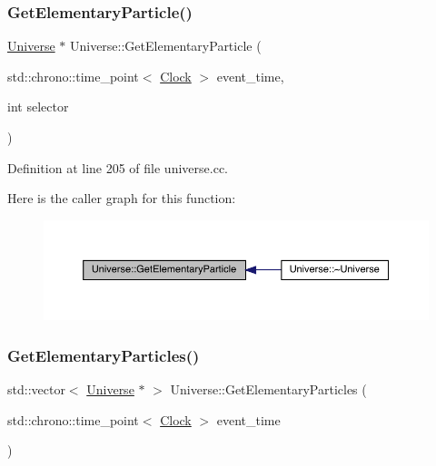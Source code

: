 \subsubsection{\texorpdfstring{Get\+Elementary\+Particle()}{GetElementaryParticle()}}
{\footnotesize\ttfamily \hyperlink{class_universe}{Universe} $\ast$ Universe\+::\+Get\+Elementary\+Particle (\begin{DoxyParamCaption}\item[{std\+::chrono\+::time\+\_\+point$<$ \hyperlink{universe_8h_a0ef8d951d1ca5ab3cfaf7ab4c7a6fd80}{Clock} $>$}]{event\+\_\+time,  }\item[{int}]{selector }\end{DoxyParamCaption})}



Definition at line 205 of file universe.\+cc.

Here is the caller graph for this function\+:
\nopagebreak
\begin{figure}[H]
\begin{center}
\leavevmode
\includegraphics[width=350pt]{class_universe_acef54e17666d17078c522388f8f6e4f9_icgraph}
\end{center}
\end{figure}
\mbox{\label{class_universe_a168fd9bf7602adcba1de5dd93a212775}} 
\subsubsection{\texorpdfstring{Get\+Elementary\+Particles()}{GetElementaryParticles()}}
{\footnotesize\ttfamily std\+::vector$<$ \hyperlink{class_universe}{Universe} $\ast$ $>$ Universe\+::\+Get\+Elementary\+Particles (\begin{DoxyParamCaption}\item[{std\+::chrono\+::time\+\_\+point$<$ \hyperlink{universe_8h_a0ef8d951d1ca5ab3cfaf7ab4c7a6fd80}{Clock} $>$}]{event\+\_\+time }\end{DoxyParamCaption})}



